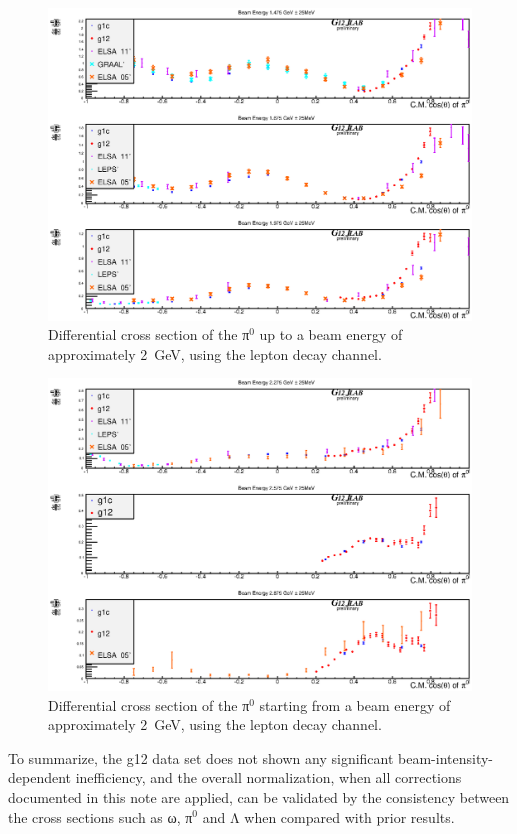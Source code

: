 \begin{figure}[htpb]
\includegraphics[width=0.95\columnwidth]{figures/xsec/G12_Pi0_XSection_forAnalysisNote_I.eps}
\caption{\label{fig:pi0.xsec.1}Differential cross section of the π$^0$ up to a beam energy of approximately 2~GeV, using the lepton decay channel.}
\end{figure}

\begin{figure}[htpb]
\includegraphics[width=0.95\columnwidth]{figures/xsec/G12_Pi0_XSection_forAnalysisNote_II.eps}
\caption{\label{fig:pi0.xsec.2}Differential cross section of the π$^0$ starting from a beam energy of approximately 2~GeV, using the lepton decay channel.}
\end{figure}

To summarize, the g12 data set does not shown any significant beam-intensity-dependent inefficiency, and the overall normalization, when all corrections documented in this note are applied, can be validated by the consistency between the cross sections such as ω, π$^0$ and Λ when compared with prior results.
